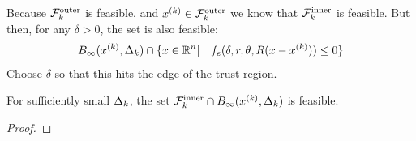 Because ${\mathcal {F}^{\text{outer}}_k}$ is feasible, and ${x^{(k)}} \in {\mathcal {F}^{\text{outer}}_k}$ we know that $ {\mathcal {F}^{\text{inner}}_k} $ is feasible.
But then, for any $\delta > 0$, the set is also feasible:
\begin{align*}
B_{\infty}({x^{(k)}}, \Delta_k) \cap \{x \in {\mathbb R^{n}} | \quad f_e(\delta, r, \theta, R(x - {x^{(k)}})) \le 0\}
\end{align*}
Choose $\delta$ so that this hits the edge of the trust region.


\begin{theorem}

For sufficiently small $\Delta_k$, the set ${\mathcal {F}^{\text{inner}}_k} \cap B_{\infty}({x^{(k)}}, \Delta_k)$ is feasible.

\end{theorem}


\begin{proof}

\end{proof}





\begin{theorem}
\end{theorem}


